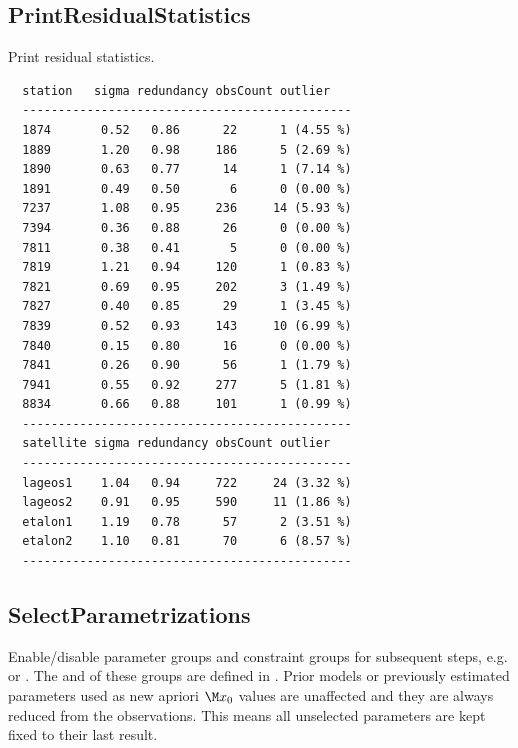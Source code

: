 \subsection{PrintResidualStatistics}\label{slrProcessingStepType:printResidualStatistics}
Print residual statistics.
\begin{verbatim}
  station   sigma redundancy obsCount outlier
  ----------------------------------------------
  1874       0.52   0.86      22      1 (4.55 %)
  1889       1.20   0.98     186      5 (2.69 %)
  1890       0.63   0.77      14      1 (7.14 %)
  1891       0.49   0.50       6      0 (0.00 %)
  7237       1.08   0.95     236     14 (5.93 %)
  7394       0.36   0.88      26      0 (0.00 %)
  7811       0.38   0.41       5      0 (0.00 %)
  7819       1.21   0.94     120      1 (0.83 %)
  7821       0.69   0.95     202      3 (1.49 %)
  7827       0.40   0.85      29      1 (3.45 %)
  7839       0.52   0.93     143     10 (6.99 %)
  7840       0.15   0.80      16      0 (0.00 %)
  7841       0.26   0.90      56      1 (1.79 %)
  7941       0.55   0.92     277      5 (1.81 %)
  8834       0.66   0.88     101      1 (0.99 %)
  ----------------------------------------------
  satellite sigma redundancy obsCount outlier
  ----------------------------------------------
  lageos1    1.04   0.94     722     24 (3.32 %)
  lageos2    0.91   0.95     590     11 (1.86 %)
  etalon1    1.19   0.78      57      2 (3.51 %)
  etalon2    1.10   0.81      70      6 (8.57 %)
  ----------------------------------------------
\end{verbatim}


\subsection{SelectParametrizations}\label{slrProcessingStepType:selectParametrizations}
Enable/disable parameter groups and constraint groups for subsequent steps,
e.g.  or
.
The  and  of these groups
are defined in .
Prior models or previously estimated parameters used as new apriori $\M x_0$ values are unaffected
and they are always reduced from the observations. This means all unselected parameters are kept fixed
to their last result.


